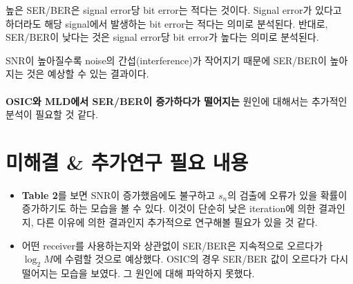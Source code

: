 \documentclass{article}
\newcommand{\bd}{\textbf} %
\begin{document}
높은 SER/BER은 signal error당 bit error는 적다는 것이다. Signal error가 있다고 하더라도 해당 signal에서 발생하는 bit error는 적다는 의미로 분석된다. 반대로, SER/BER이 낮다는 것은 signal error당 bit error가 높다는 의미로 분석된다.

SNR이 높아질수록 noise의 간섭(interference)가 작어지기 때문에 SER/BER이 높아지는 것은 예상할 수 있는 결과이다.\\
\\
\bd{OSIC와 MLD에서 SER/BER이 증가하다가 떨어지는} 원인에 대해서는 추가적인 분석이 필요할 것 같다.

\section{미해결 \& 추가연구 필요 내용}
\begin{itemize}
	\item \bd{Table 2}를 보면 SNR이 증가했음에도 불구하고 $s_n$의 검출에 오류가 있을 확률이 증가하기도 하는 모습을 볼 수 있다. 이것이 단순히 낮은 iteration에 의한 결과인지, 다른 이유에 의한 결과인지 추가적으로 연구해볼 필요가 있을 것 같다.
	\item 어떤 receiver를 사용하는지와 상관없이 SER/BER은 지속적으로 오르다가 $\log_{2}M$에 수렴할 것으로 예상했다. OSIC의 경우 SER/BER 값이 오르다가 다시 떨어지는 모습을 보였다. 그 원인에 대해 파악하지 못했다.
\end{itemize}
\end{document}
